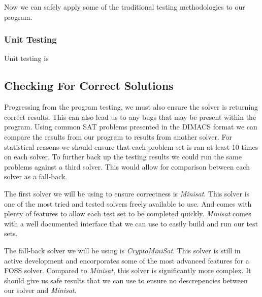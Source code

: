 \documentclass{article}
\begin{document}

Now we can safely apply some of the traditional testing methodologies to our program.

\subsubsection{Unit Testing}
Unit testing is 


\subsection{Checking For Correct Solutions}
Progressing from the program testing, we must also ensure the solver is returning correct results.
This can also lead us to any bugs that may be present within the program. Using common SAT problems
presented in the DIMACS format we can compare the results from our program to results from another
solver. For statistical reasons we should ensure that each problem set is ran at least 10 times on
each solver. To further back up the testing results we could run the same problems against a third
solver. This would allow for comparison between each solver as a fall-back.

The first solver we will be using to ensure correctness is \textit{Minisat}. This solver is one of
the most tried and tested solvers freely available to use. And comes with plenty of features to
allow each test set to be completed quickly. \textit{Minisat} comes with a well documented interface
that we can use to easily build and run our test sets.


The fall-back solver we will be using is \textit{CryptoMiniSat}. This solver is still in active
development and encorporates some of the most advanced features for a FOSS solver. Compared to
\textit{Minisat}, this solver is significantly more complex. It should give us safe results that we
can use to ensure no descrepencies between our solver and \textit{Minisat}.

\end{document}
